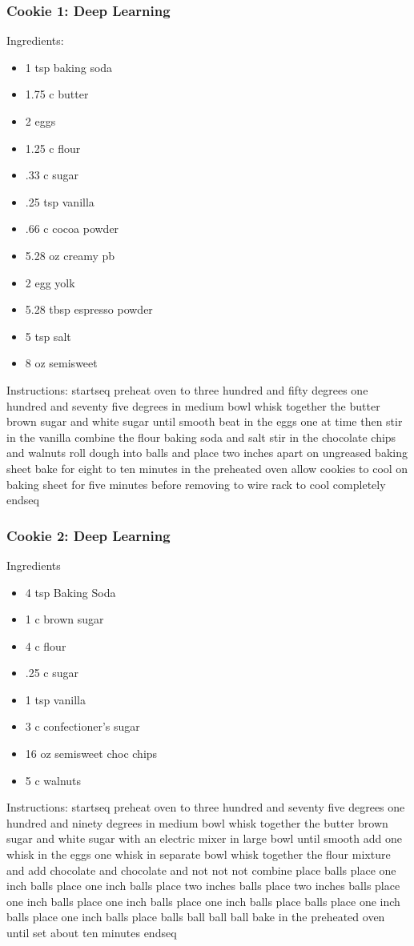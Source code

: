 \documentclass[11pt, a4paper]{article}
\begin{document}
		\subsubsection*{Cookie 1: Deep Learning}
		Ingredients:
		\begin{multicols}{2}
				\begin{itemize}
					\item1 tsp baking soda
					\item1.75 c butter
					\item2 eggs
					\item1.25 c flour
					\item .33 c sugar
					\item.25 tsp vanilla
					\item.66 c cocoa powder
					\item5.28 oz creamy pb
					\item2 egg yolk
					\item5.28 tbsp espresso powder
					\item5 tsp salt
					\item8 oz semisweet
			\end{itemize}
		\end{multicols}
		Instructions:
		startseq preheat oven to three hundred and fifty degrees one hundred and seventy five degrees in medium bowl whisk together the butter brown sugar and white sugar until smooth beat in the eggs one at time then stir in the vanilla combine the flour baking soda and salt stir in the chocolate chips and walnuts roll dough into balls and place two inches apart on ungreased baking sheet bake for eight to ten minutes in the preheated oven allow cookies to cool on baking sheet for five minutes before removing to wire rack to cool completely endseq
	\subsubsection*{Cookie 2: Deep Learning}
	Ingredients
		\begin{multicols}{2}			\begin{itemize}
				\item 4 tsp Baking Soda
				\item1 c brown sugar
				\item 4 c flour
				\item .25 c sugar
				\item 	1 tsp vanilla
				\item 3 c confectioner’s sugar
				\item 16 oz semisweet choc chips
				\item 5 c walnuts
			\end{itemize}
		\end{multicols}
	Instructions: startseq preheat oven to three hundred and seventy five degrees one hundred and ninety degrees in medium bowl whisk together the butter brown sugar and white sugar with an electric mixer in large bowl until smooth add one whisk in the eggs one whisk in separate bowl whisk together the flour mixture and add chocolate and chocolate and not not not combine place balls place one inch balls place one inch balls place two inches balls place two inches balls place one inch balls place one inch balls place one inch balls place balls place one inch balls place one inch balls place balls ball ball ball bake in the preheated oven until set about ten minutes endseq
\end{document}
